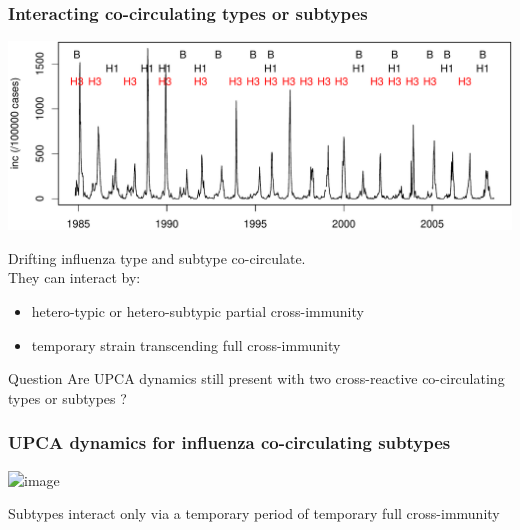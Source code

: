 \documentclass{beamer}
\begin{document}
\begin{frame}
  \frametitle{Interacting co-circulating types or subtypes}
  \begin{center}
    \includegraphics[width=0.8 \linewidth]{graph/data_flu.pdf}    
  \end{center}
  Drifting influenza type and subtype co-circulate. \\ 
  They can interact by: 
  \begin{itemize}
  \item hetero-typic or hetero-subtypic partial cross-immunity
  \item \alert{temporary strain transcending full cross-immunity}
  \end{itemize}
  \pause
  \begin{block}{Question}
    Are UPCA dynamics still present with two cross-reactive
    co-circulating types or subtypes ?
  \end{block}
\end{frame}


\begin{frame}
  \frametitle{UPCA dynamics for influenza co-circulating subtypes}
  
  \begin{center}
    \includegraphics<1>[width=0.8\textwidth]{graph/main2.png}
  \end{center}

  \begin{block}{}
    Subtypes interact only via a temporary period of temporary full cross-immunity    
  \end{block}

\end{frame}
\end{document}
